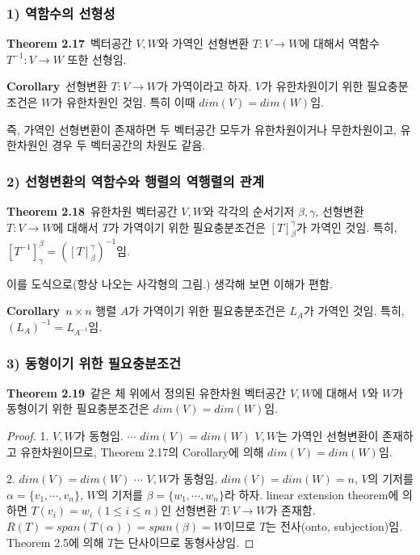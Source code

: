\documentclass[10pt, a4paper]{article}
\begin{document}
\subsubsection*{1) 역함수의 선형성}
\textbf{Theorem 2.17}\, 벡터공간 $V,W$와 가역인 선형변환 $T:V \rightarrow W$에 대해서 역함수 $T^{-1}:V \rightarrow W$ 또한 선형임.

\textbf{Corollary}\, 선형변환 $T:V \rightarrow W$가 가역이라고 하자. $V$가 유한차원이기 위한 필요충분조건은 $W$가 유한차원인 것임. 특히 이때 $dim(V)=dim(W)$임.

즉, 가역인 선형변환이 존재하면 두 벡터공간 모두가 유한차원이거나 무한차원이고, 유한차원인 경우 두 벡터공간의 차원도 같음.

\subsubsection*{2) 선형변환의 역함수와 행렬의 역행렬의 관계}
\textbf{Theorem 2.18}\, 유한차원 벡터공간 $V,W$와 각각의 순서기저 $\beta,\gamma$, 선형변환 $T:V \rightarrow W$에 대해서 $T$가 가역이기 위한 필요충분조건은 $[T]^{\gamma}_{\beta}$가 가역인 것임. 특히, $[T^{-1}]_{\gamma}^{\beta}=([T]_{\beta}^{\gamma})^{-1}$임.

이를 도식으로(항상 나오는 사각형의 그림.) 생각해 보면 이해가 편함.

\textbf{Corollary}\, $n \times n$ 행렬 $A$가 가역이기 위한 필요충분조건은 $L_A$가 가역인 것임. 특히, $(L_A)^{-1}=L_{A^{-1}}$임.

\subsubsection*{3) 동형이기 위한 필요충분조건}
\textbf{Theorem 2.19}\, 같은 체 위에서 정의된 유한차원 벡터공간 $V,W$에 대해서 $V$와 $W$가 동형이기 위한 필요충분조건은 $dim(V)=dim(W)$임.

\begin{proof}
1. $V,W$가 동형임. $\cdots$ $dim(V)=dim(W)$
$V,W$는 가역인 선형변환이 존재하고 유한차원이므로, Theorem 2.17의 Corollary에 의해 $dim(V)=dim(W)$임.

2. $dim(V)=dim(W)$ $\cdots$ $V,W$가 동형임.
$dim(V)=dim(W)=n$, $V$의 기저를 $\alpha=\{v_1, \cdots ,v_n\}$, $W$의 기저를 $\beta=\{w_1, \cdots ,w_n\}$라 하자. linear extension theorem에 의하면 $T(v_i)=w_i\,(1 \leq i \leq n)$인 선형변환 $T:V \rightarrow W$가 존재함. $R(T)=span(T(\alpha))=span(\beta)=W$이므로 $T$는 전사(onto, subjection)임. Theorem 2.5에 의해 $T$는 단사이므로 동형사상임.
\end{proof}
\end{document}
